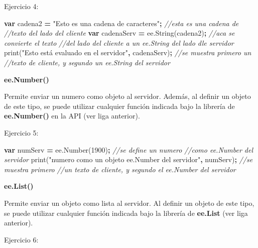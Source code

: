 \documentclass[
]{article}
\newenvironment{Shaded}{\begin{snugshade}}{\end{snugshade}}
\newcommand{\AttributeTok}[1]{\textcolor[rgb]{0.77,0.63,0.00}{#1}}
\newcommand{\CommentTok}[1]{\textcolor[rgb]{0.56,0.35,0.01}{\textit{#1}}}
\newcommand{\DecValTok}[1]{\textcolor[rgb]{0.00,0.00,0.81}{#1}}
\newcommand{\KeywordTok}[1]{\textcolor[rgb]{0.13,0.29,0.53}{\textbf{#1}}}
\newcommand{\NormalTok}[1]{#1}
\newcommand{\OperatorTok}[1]{\textcolor[rgb]{0.81,0.36,0.00}{\textbf{#1}}}
\newcommand{\StringTok}[1]{\textcolor[rgb]{0.31,0.60,0.02}{#1}}
\newcommand{\VariableTok}[1]{\textcolor[rgb]{0.00,0.00,0.00}{#1}}
\begin{document}
Ejercicio 4:

\begin{Shaded}
\begin{Highlighting}[]
\KeywordTok{var}\NormalTok{ cadena2 }\OperatorTok{=} \StringTok{"Esto es una cadena de caracteres"}\OperatorTok{;}           \CommentTok{//esta es una cadena de }
\CommentTok{//texto del lado del cliente}
\KeywordTok{var}\NormalTok{ cadenaServ }\OperatorTok{=} \VariableTok{ee}\NormalTok{.}\AttributeTok{String}\NormalTok{(cadena2)}\OperatorTok{;}                        \CommentTok{//aca se convierte el texto }
\CommentTok{//del lado del cliente a un ee.String del lado dle servidor}
\AttributeTok{print}\NormalTok{(}\StringTok{"Esto está evaluado en el servidor"}\OperatorTok{,}\NormalTok{ cadenaServ)}\OperatorTok{;}     \CommentTok{//se muestra primero un }
\CommentTok{//texto de cliente, y segundo un ee.String del servidor  }
\end{Highlighting}
\end{Shaded}

\textbf{ee.Number()}

Permite enviar un numero como objeto al servidor. Además, al definir un
objeto de este tipo, se puede utilizar cualquier función indicada bajo
la librería de \textbf{ee.Number()} en la API (ver liga anterior).

Ejercicio 5:

\begin{Shaded}
\begin{Highlighting}[]
\KeywordTok{var}\NormalTok{ numServ }\OperatorTok{=} \VariableTok{ee}\NormalTok{.}\AttributeTok{Number}\NormalTok{(}\DecValTok{1900}\NormalTok{)}\OperatorTok{;}                                    \CommentTok{//se define un numero }
\CommentTok{//como ee.Number del servidor}
\AttributeTok{print}\NormalTok{(}\StringTok{"numero como un objeto ee.Number del servidor"}\OperatorTok{,}\NormalTok{ numServ)}\OperatorTok{;}   \CommentTok{//se muestra primero }
\CommentTok{//un texto de cliente, y segundo el ee.Number del servidor}
\end{Highlighting}
\end{Shaded}

\textbf{ee.List()}

Permite enviar un objeto como lista al servidor. Al definir un objeto de
este tipo, se puede utilizar cualquier función indicada bajo la librería
de \textbf{ee.List} (ver liga anterior).

Ejercicio 6:
\end{document}
